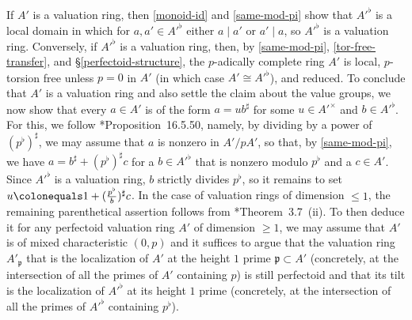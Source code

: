 \documentclass[11pt, reqno]{amsart}
\newcommand{\fp}{\mathfrak{p}}
\newcommand{\ce}{\colonequals}
\numberwithin{equation}{numberingbase}
\theoremstyle{thms}
\theoremstyle{claims}
\theoremstyle{defs}
\theoremstyle{thms}
\theoremstyle{defs}
\theoremstyle{subsection-tweak}
\theoremstyle{subsection-tweak}
\begin{document}
If $A'$ is a valuation ring, then \eqref{monoid-id} and \eqref{same-mod-pi} show that $A'^\flat$ is a local domain in which for $a, a' \in A'^\flat$ either $a \mid a'$ or $a' \mid a$, so  $A'^\flat$ is a valuation ring. Conversely, if $A'^\flat$ is a valuation ring, then, by \eqref{same-mod-pi}, \eqref{tor-free-transfer}, and \S\ref{perfectoid-structure}, the $p$-adically complete ring $A'$ is local, $p$-torsion free unless $p = 0$ in $A'$ (in which case $A' \cong A'^\flat$), and reduced. To conclude that $A'$ is a valuation ring and also settle the claim about the value groups, we now show that every $a \in A'$ is of the form $a = ub^\sharp$ for some $u \in A'^\times$ and $b \in A'^\flat$. For this, we follow \cite{GR18}*{Proposition~16.5.50}, namely, by dividing by a power of $(p^\flat)^\sharp$, we may assume that $a$ is nonzero in $A'/pA'$, so that, by \eqref{same-mod-pi}, we have $a = b^\sharp + (p^\flat)^\sharp c$ for a $b \in A'^\flat$ that is nonzero modulo $p^\flat$ and a $c \in A'$. Since $A'^\flat$ is a valuation ring, $b$ strictly divides $p^\flat$, so it remains to set $u \ce 1 + (\frac{p^\flat}b)^\sharp c$. In the case of valuation rings of dimension $\le 1$, the remaining parenthetical assertion follows from \cite{Sch12}*{Theorem~3.7~(ii)}. %
To then deduce it for any perfectoid valuation ring $A'$ of dimension $\ge 1$, we may assume that $A'$ is of mixed characteristic $(0, p)$ and it suffices to argue that the valuation ring $A'_\fp$ that is the localization of $A'$ at the height $1$ prime $\fp \subset A'$ (concretely, at the intersection of all the primes of $A'$ containing $p$) is still perfectoid and that its tilt is the localization of $A'^\flat$ at its height $1$ prime (concretely, at the intersection of all the primes of $A'^\flat$ containing $p^\flat$).
\end{document}
